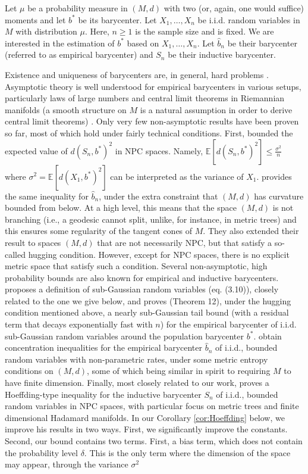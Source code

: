 \documentclass[10pt,a4paper]{article}
\theoremstyle{plain}
\theoremstyle{definition}
\theoremstyle{remark}
\newcommand{\E}{\mathbb{E}}
\begin{document}
Let $\mu$ be a probability measure in $(M,d)$ with two (or, again, one would suffice) moments and let $b^*$ be its barycenter. Let $X_1,\ldots,X_n$ be i.i.d. random variables in $M$ with distribution $\mu$. Here, $n\geq 1$ is the sample size and is fixed. We are interested in the estimation of $b^*$ based on $X_1,\ldots,X_n$. Let $\hat b_n$ be their barycenter (referred to as empirical barycenter) and $S_n$ be their inductive barycenter.

Existence and uniqueness of barycenters are, in general, hard problems \cite{afsari2011riemannian, Yokota16,Yokota18}. Asymptotic theory is well understood for empirical barycenters in various setups, particularly laws of large numbers \cite{ziezold1977expected} and central limit theorems in Riemannian manifolds (a smooth structure on $M$ is a natural assumption in order to derive central limit theorems) \cite{bhattacharya2003large,bhattacharya2005large,bhattacharya2017omnibus,eltzner2019smeary,eltzner2019stability}. Only very few non-asymptotic results have been proven so far, most of which hold under fairly technical conditions. First, \cite[Theorem 4.7]{sturm03} bounded the expected value of $d(S_n,b^*)^2$ in NPC spaces. Namely, $\E[d(S_n,b^*)^2]\leq \frac{\sigma^2}{n}$ where $\sigma^2=\E[d(X_1,b^*)^2]$ can be interpreted as the variance of $X_1$. \cite[Corollary 11]{fastconv} provides the same inequality for $\hat b_n$, under the extra constraint that $(M,d)$ has curvature bounded from below. At a high level, this means that the space $(M,d)$ is not branching (i.e., a geodesic cannot split, unlike, for instance, in metric trees) and this ensures some regularity of the tangent cones of $M$. They also extended their result to spaces $(M,d)$ that are not necessarily NPC, but that satisfy a so-called hugging condition. However, except for NPC spaces, there is no explicit metric space that satisfy such a condition. Several non-asymptotic, high probability bounds are also known for empirical and inductive barycenters. \cite{fastconv} proposes a definition of sub-Gaussian random variables (eq. (3.10)), closely related to the one we give below, and proves (Theorem 12), under the hugging condition mentioned above, a nearly sub-Gaussian tail bound (with a residual term that decays exponentially fast with $n$) for the empirical barycenter of i.i.d. sub-Gaussian random variables around the population barycenter $b^*$. \cite{convrate} obtain concentration inequalities for the empirical barycenter $\hat b_n$ of i.i.d., bounded random variables with non-parametric rates, under some metric entropy conditions on $(M,d)$, some of which being similar in spirit to requiring $M$ to have finite dimension. Finally, most closely related to our work, \cite{Funano10} proves a Hoeffding-type inequality for the inductive barycenter $S_n$ of i.i.d., bounded random variables in NPC spaces, with particular focus on metric trees and finite dimensional Hadamard manifolds. In our Corollary \ref{cor:Hoeffding} below, we improve his results in two ways. First, we significantly improve the constants. Second, our bound contains two terms. First, a bias term, which does not contain the probability level $\delta$. This is the only term where the dimension of the space may appear, through the variance $\sigma^2$ 
\end{document}
